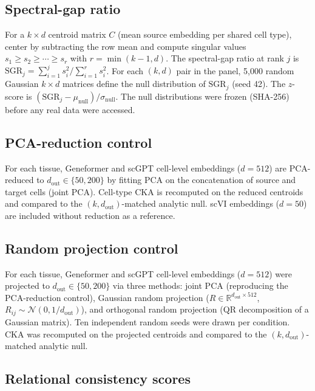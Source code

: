\documentclass[11pt]{article}
\newcommand{\R}{\mathbb{R}}
\begin{document}
\subsection{Spectral-gap ratio}
\label{sec:sgrmethod}

For a $k \times d$ centroid matrix $C$ (mean source embedding per
shared cell type), center by subtracting the row mean and compute
singular values $s_1 \geq s_2 \geq \cdots \geq s_r$ with $r =
\min(k{-}1, d)$. The spectral-gap ratio at rank $j$ is $\mathrm{SGR}_j
= \sum_{i=1}^j s_i^2 / \sum_{i=1}^r s_i^2$. For each $(k, d)$ pair in
the panel, 5,000 random Gaussian $k \times d$ matrices define the null
distribution of $\mathrm{SGR}_j$ (seed 42). The $z$-score is
$({\mathrm{SGR}_j - \mu_{\mathrm{null}}}) / {\sigma_{\mathrm{null}}}$.
The null distributions were frozen (SHA-256) before any real data were
accessed.

\subsection{PCA-reduction control}

For each tissue, Geneformer and scGPT cell-level embeddings ($d = 512$)
are PCA-reduced to $d_{\mathrm{out}} \in \{50, 200\}$ by fitting PCA on
the concatenation of source and target cells (joint PCA). Cell-type CKA
is recomputed on the reduced centroids and compared to the
$(k, d_{\mathrm{out}})$-matched analytic null. scVI embeddings
($d = 50$) are included without reduction as a reference.

\subsection{Random projection control}
\label{sec:randprojmethod}

For each tissue, Geneformer and scGPT cell-level embeddings ($d = 512$)
were projected to $d_{\mathrm{out}} \in \{50, 200\}$ via three methods:
joint PCA (reproducing the PCA-reduction control), Gaussian random
projection ($R \in \R^{d_{\mathrm{out}} \times 512}$,
$R_{ij} \sim \mathcal{N}(0, 1/d_{\mathrm{out}})$), and orthogonal
random projection (QR decomposition of a Gaussian matrix). Ten
independent random seeds were drawn per condition. CKA was recomputed on
the projected centroids and compared to the
$(k, d_{\mathrm{out}})$-matched analytic null.

\subsection{Relational consistency scores}
\label{sec:scgraphmethod}
\end{document}

